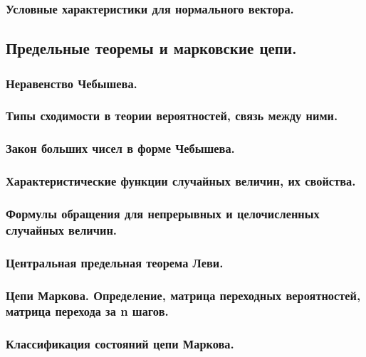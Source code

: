 \documentclass[14pt]{extarticle}
\theoremstyle{breakstyle}
\begin{document}
\subsubsection{Условные характеристики для нормального вектора.}


\subsection{Предельные теоремы и марковские цепи.}

\subsubsection{Неравенство Чебышева.}

\subsubsection{Типы сходимости в теории вероятностей, связь между ними.}

\subsubsection{Закон больших чисел в форме Чебышева.}

\subsubsection{Характеристические функции случайных величин, их свойства.}

\subsubsection{Формулы обращения для непрерывных и целочисленных случайных величин.}

\subsubsection{Центральная предельная теорема Леви.}

\subsubsection{Цепи Маркова. Определение, матрица переходных вероятностей, матрица перехода за n шагов.}

\subsubsection{Классификация состояний цепи Маркова.}
\end{document}
